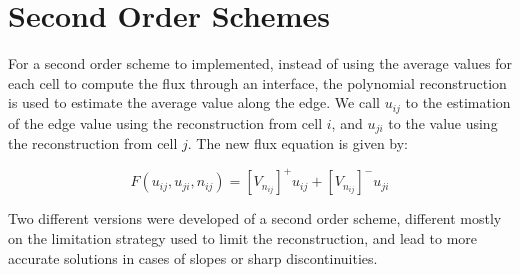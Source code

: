 \section{Second Order Schemes}
\label{sec:400}


For a second order scheme to implemented, instead of using the average values for each cell to compute the flux through an interface, the polynomial reconstruction is used to estimate the average value along the edge. We call $u_{ij}$ to the estimation of the edge value using the reconstruction from cell $i$, and $u_{ji}$ to the value using the reconstruction from cell $j$. The new flux equation is given by:

$$
F(u_{ij}, u_{ji}, n_{ij}) = [V_{n_{ij}}]^{+}u_{ij} + [V_{n_{ij}}]^{-}u_{ji}
$$

Two different versions were developed of a second order scheme, different mostly on the limitation strategy used to limit the reconstruction, and lead to more accurate solutions in cases of slopes or sharp discontinuities.


